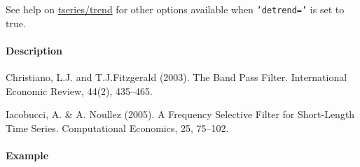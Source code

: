  See help on \url{tseries/trend} for other options available when
 \texttt{'detrend='} is set to true.
 
 \paragraph{Description}
 
 Christiano, L.J. and T.J.Fitzgerald (2003). The Band Pass Filter.
 International Economic Review, 44(2), 435--465.
 
 Iacobucci, A. \& A. Noullez (2005). A Frequency Selective Filter for
 Short-Length Time Series. Computational Economics, 25, 75--102.
 
 \paragraph{Example}


